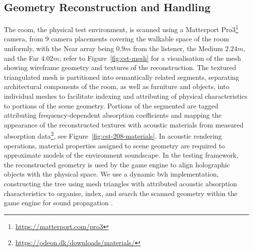 \subsection{Geometry Reconstruction and Handling}
The room, the physical test environment, is scanned using a Matterport Pro3\footnote{\url{https://matterport.com/pro3}} camera, from 9 camera placements covering the walkable space of the room uniformly, with the Near array being $0.9m$ from the listener, the Medium $2.24m$, and the Far $4.02m$;  refer to Figure~\ref{fig:cst-mesh} for a visualisation of the mesh showing wireframe geometry and textures of the reconstruction. The textured triangulated mesh is partitioned into semantically related segments, separating architectural components of the room, as well as furniture and objects, into individual meshes to facilitate indexing and attributing of physical characteristics to portions of the scene geometry. Portions of the segmented are tagged attributing frequency-dependent absorption coefficients and mapping the appearance of the reconstructed textures with acoustic materials from measured absorption data\footnote{\url{https://odeon.dk/downloads/materials/}}, see Figure~\ref{fig:cst-208-materials}. In acoustic rendering operations, material properties assigned to scene geometry are required to approximate models of the environment soundscape. 
In the testing framework, the reconstructed geometry is used by the game engine to align holographic objects with the physical space. We use a dynamic \acrshort{bvh} implementation, constructing the tree using mesh triangles with attributed acoustic absorption characteristics to organise, index, and search the scanned geometry within the game engine for sound propagation \citep{kopta2012fast}.\par


